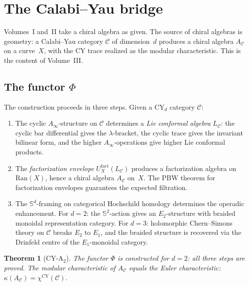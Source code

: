 \documentclass[11pt,reqno]{amsart}
\newtheorem{theorem}{Theorem}[section]
\theoremstyle{definition}
\theoremstyle{remark}
\providecommand{\Ran}{\mathrm{Ran}}
\numberwithin{equation}{section}
\begin{document}
\section{The Calabi--Yau bridge}
\label{sec:cy-bridge}

Volumes~I and~II take a chiral algebra as given. The source
of chiral algebras is geometry: a Calabi--Yau category
$\mathcal{C}$ of dimension~$d$ produces a chiral algebra
$A_\mathcal{C}$ on a curve~$X$, with the CY trace realized
as the modular characteristic. This is the content of
Volume~III.

\subsection{The functor $\Phi$}
\label{ssec:functor-phi}

The construction proceeds in three steps. Given a CY$_d$
category $\mathcal{C}$:

\begin{enumerate}[(1)]
\item The cyclic $A_\infty$-structure on $\mathcal{C}$
 determines a \emph{Lie conformal algebra} $L_\mathcal{C}$:
 the cyclic bar differential gives the $\lambda$-bracket,
 the cyclic trace gives the invariant bilinear form, and
 the higher $A_\infty$-operations give higher Lie conformal
 products.

\item The \emph{factorization envelope}
 $U_X^{\mathrm{fact}}(L_\mathcal{C})$ produces a
 factorization algebra on $\Ran(X)$, hence a chiral algebra
 $A_\mathcal{C}$ on~$X$. The PBW theorem for factorization
 envelopes guarantees the expected filtration.

\item The $\mathbb{S}^d$-framing on categorical Hochschild homology
 determines the operadic enhancement. For $d = 2$: the
 $\mathbb{S}^2$-action gives an $E_2$-structure with braided
 monoidal representation category. For $d = 3$: holomorphic
 Chern--Simons theory on $\mathcal{C}$ breaks $E_2$ to $E_1$,
 and the braided structure is recovered via the Drinfeld centre
 of the $E_1$-monoidal category.
\end{enumerate}

\begin{theorem}[CY-A$_2$]
\label{thm:cy-a2}
The functor $\Phi$ is constructed for $d = 2$: all three steps
are proved. The modular characteristic of $A_\mathcal{C}$
equals the Euler characteristic:
$\kappa(A_\mathcal{C}) = \chi^{\mathrm{CY}}(\mathcal{C})$.
\end{theorem}
\end{document}
